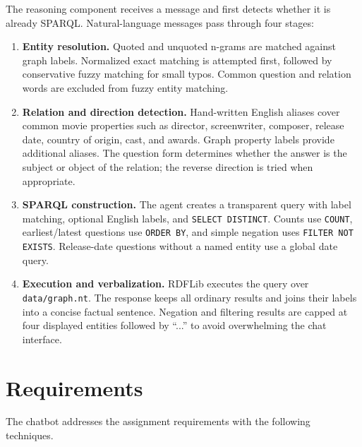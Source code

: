 \documentclass[10pt,a4paper]{article}
\begin{document}
The reasoning component receives a message and first detects whether it is already SPARQL. Natural-language messages pass through four stages:

\begin{enumerate}
    \item \textbf{Entity resolution.} Quoted and unquoted n-grams are matched against graph labels. Normalized exact matching is attempted first, followed by conservative fuzzy matching for small typos. Common question and relation words are excluded from fuzzy entity matching.
    \item \textbf{Relation and direction detection.} Hand-written English aliases cover common movie properties such as director, screenwriter, composer, release date, country of origin, cast, and awards. Graph property labels provide additional aliases. The question form determines whether the answer is the subject or object of the relation; the reverse direction is tried when appropriate.
    \item \textbf{SPARQL construction.} The agent creates a transparent query with label matching, optional English labels, and \texttt{SELECT DISTINCT}. Counts use \texttt{COUNT}, earliest/latest questions use \texttt{ORDER BY}, and simple negation uses \texttt{FILTER NOT EXISTS}. Release-date questions without a named entity use a global date query.
    \item \textbf{Execution and verbalization.} RDFLib executes the query over \texttt{data/graph.nt}. The response keeps all ordinary results and joins their labels into a concise factual sentence. Negation and filtering results are capped at four displayed entities followed by ``...'' to avoid overwhelming the chat interface.
\end{enumerate}
\newpage
\section{Requirements}
The chatbot addresses the assignment requirements with the following techniques.
\end{document}
